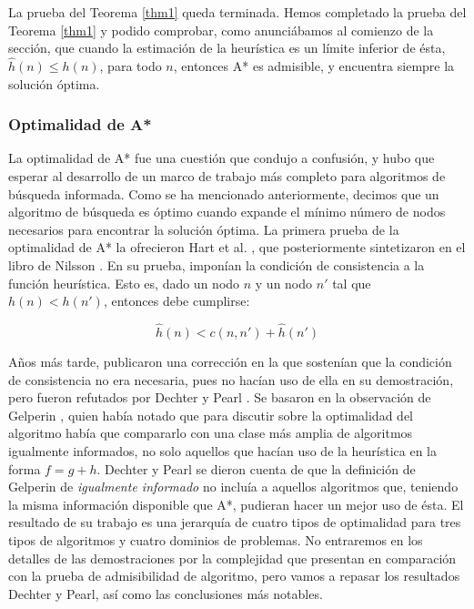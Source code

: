 \documentclass[a4paper,12pt]{article}
\begin{document}
La prueba del Teorema \ref{thm1} queda terminada. Hemos completado la prueba del Teorema \ref{thm1} y podido comprobar, como anunciábamos al comienzo de la sección, que cuando la estimación de la heurística es un límite inferior de ésta, $\hat{h}(n) \leq h(n)$, para todo $n$, entonces A* es admisible, y encuentra siempre la solución óptima.

\subsubsection{Optimalidad de A*}\label{sec:optimalidad}

La optimalidad de A* fue una cuestión que condujo a confusión, y hubo que esperar al desarrollo de un marco de trabajo más completo para algoritmos de búsqueda informada. Como se ha mencionado anteriormente, decimos que un algoritmo de búsqueda es óptimo cuando expande el mínimo número de nodos necesarios para encontrar la solución óptima. La primera prueba de la optimalidad de A* la ofrecieron Hart et al. \cite{hart_formal_1968}, que posteriormente sintetizaron en el libro de Nilsson \cite{nillsson1971problem}. En su prueba, imponían la condición de consistencia a la función heurística. Esto es, dado un nodo $n$ y un nodo $n'$ tal que $h(n) < h(n')$, entonces debe cumplirse:

\begin{equation}
\hat{h}(n) < c(n,n') + \hat{h}(n')
\end{equation}

Años más tarde, publicaron una corrección \cite{hart_correction_1972} en la que sostenían que la condición de consistencia no era necesaria, pues no hacían uso de ella en su demostración, pero fueron refutados por Dechter y Pearl \cite{dechter1985generalized, dechter1983optimality}. Se basaron en la observación de Gelperin \cite{gelperin1977optimality}, quien había notado que para discutir sobre la optimalidad del algoritmo había que compararlo con una clase más amplia de algoritmos igualmente informados, no solo aquellos que hacían uso de la heurística en la forma $f = g + h$. Dechter y Pearl se dieron cuenta de que la definición de Gelperin de \textit{igualmente informado} no incluía a aquellos algoritmos que, teniendo la misma información disponible que A*, pudieran hacer un mejor uso de ésta. El resultado de su trabajo es una jerarquía de cuatro tipos de optimalidad para tres tipos de algoritmos y cuatro dominios de problemas. No entraremos en los detalles de las demostraciones por la complejidad que presentan en comparación con la prueba de admisibilidad de algoritmo, pero vamos a repasar los resultados Dechter y Pearl, así como las conclusiones más notables.
\end{document}
